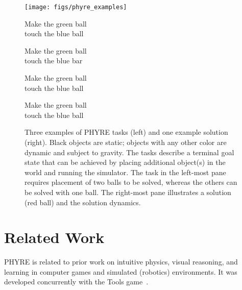 \documentclass{article}
\begin{document}
\begin{figure}[t]
\centering
  \texttt{[image: figs/phyre\_examples]}
  \begin{minipage}{0.245\linewidth}
    \centering
    \scriptsize
    Make the green ball\\touch the blue ball
  \end{minipage}
  \begin{minipage}{0.245\linewidth}
    \centering
    \scriptsize
    Make the green ball\\touch the blue bar
  \end{minipage}
  \begin{minipage}{0.245\linewidth}
    \centering
    \scriptsize
    Make the green ball\\touch the blue ball
  \end{minipage}
  \begin{minipage}{0.245\linewidth}
    \centering
    \scriptsize
    Make the green ball\\touch the blue ball
  \end{minipage}
\caption{Three examples of PHYRE tasks (left) and one example solution (right). Black objects are static; objects with any other color are dynamic and subject to gravity. The tasks describe a terminal goal state that can be achieved by placing additional object(s) in the world and running the simulator. The task in the left-most pane requires placement of two balls to be solved, whereas the others can be solved with one ball. The right-most pane illustrates a solution (red ball) and the solution dynamics.}
\label{fig:phyre_examples}
\end{figure}
 

\section{Related Work}
\label{sec:related_work}

PHYRE is related to prior work on intuitive physics, visual reasoning, and learning in computer games and simulated (robotics) environments. It was developed concurrently with the Tools game~\cite{allen2019tools}.
\end{document}
